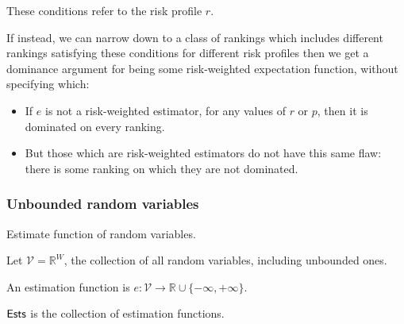 \documentclass[11pt]{article}
\theoremstyle{definition}
\theoremstyle{remark}
\newtheorem{remark}[theorem]{Remark}
\newcommand{\R}{\mathbb R}
\newcommand{\Exp}{\operatorname{Exp}}
\newcommand{\given}{\,:\,}
\begin{document}
%
%	
%
%
%
%

These conditions refer to the risk profile $r$. 

If instead, we can narrow down to a class of rankings which includes different rankings satisfying these conditions for different risk profiles then we get a dominance argument for being some risk-weighted expectation function, without specifying which:
\begin{itemize}
	\item If $e$ is not a risk-weighted estimator, for any values of $r$ or $p$, then it is dominated on every ranking.
	\item But those which are risk-weighted estimators do not have this same flaw: there is some ranking on which they are not dominated. 
\end{itemize}

\subsubsection{Unbounded random variables}
Estimate function of random variables. 

Let $\mathcal{V}=\R^W$, the collection of all random variables, including unbounded ones. 

An estimation function is $e:\mathcal{V}\to \R\cup\{-\infty,+\infty\}$. 


$\mathsf{Ests}$ is the collection of estimation functions. 
\end{document}
